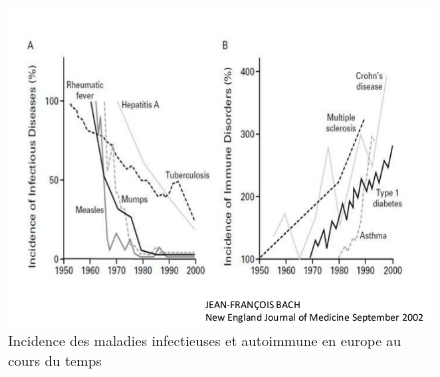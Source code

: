 \documentclass[12pt,a4paper]{article}
\begin{document}
\begin{figure}[ht]
\begin{center}
\includegraphics[scale=0.5]{img/allergie_infection.jpg}\hfill
\end{center}
\caption{Incidence des maladies infectieuses et autoimmune en europe au cours du temps}
\label{bach}
\end{figure}
\end{document}
